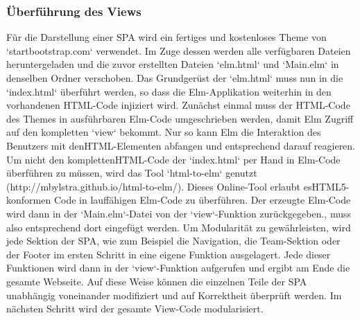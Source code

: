 \subsubsection{Überführung des Views}
\label{sec:Überführung des Views}
Für die Darstellung einer SPA wird ein fertiges und kostenloses Theme von `startbootstrap.com` verwendet. Im Zuge dessen werden alle verfügbaren Dateien heruntergeladen und die zuvor erstellten Dateien `elm.html` und `Main.elm` in denselben Ordner verschoben.
Das Grundgerüst der `elm.html` muss nun in die `index.html` überführt werden, so dass die Elm-Applikation weiterhin in den vorhandenen \ac{HTML}-Code injiziert wird.
Zunächst einmal muss der \ac{HTML}-Code des Themes in ausführbaren Elm-Code umgeschrieben werden, damit Elm Zugriff auf den kompletten `view` bekommt. Nur so kann Elm die Interaktion des Benutzers mit den\ac{HTML}-Elementen abfangen und entsprechend darauf reagieren. Um nicht den kompletten\ac{HTML}-Code der `index.html` per Hand in Elm-Code überführen zu müssen, wird das Tool `html-to-elm` genutzt (http://mbylstra.github.io/html-to-elm/). Dieses Online-Tool erlaubt es\ac{HTML}5-konformen Code in lauffähigen Elm-Code zu überführen. Der erzeugte Elm-Code wird dann in der `Main.elm`-Datei von der `view`-Funktion zurückgegeben., muss also entsprechend dort eingefügt werden.
Um Modularität zu gewährleisten, wird jede Sektion der SPA, wie zum Beispiel die Navigation, die Team-Sektion oder der Footer im ersten Schritt in eine eigene Funktion ausgelagert. Jede dieser Funktionen wird dann in der `view`-Funktion aufgerufen und ergibt am Ende die gesamte Webseite. Auf diese Weise können die einzelnen Teile der SPA unabhängig voneinander modifiziert und auf Korrektheit überprüft werden. Im nächsten Schritt wird der gesamte View-Code modularisiert.
\fi
